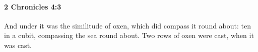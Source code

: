 
		\paragraph{2 Chronicles 4:3} %
			\label{2CHRONICLES-4-3}

			And under it was the similitude of oxen, which did compass it round about: ten in a cubit, compassing the sea round about. Two rows of oxen were cast, when it was cast.


